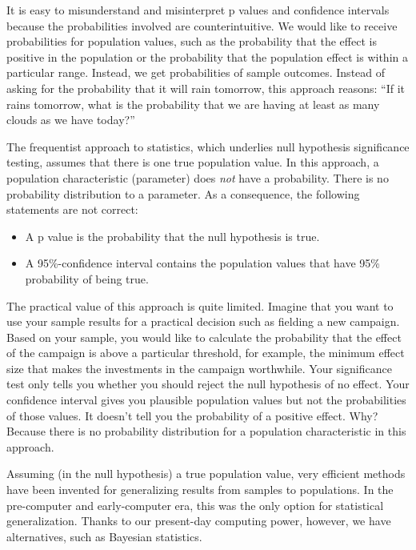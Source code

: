 \documentclass[
  english,
  doc]{apa6}
\providecommand{\tightlist}{%
  \setlength{\itemsep}{0pt}\setlength{\parskip}{0pt}}
\begin{document}
It is easy to misunderstand and misinterpret p values and confidence intervals because the probabilities involved are counterintuitive. We would like to receive probabilities for population values, such as the probability that the effect is positive in the population or the probability that the population effect is within a particular range. Instead, we get probabilities of sample outcomes. Instead of asking for the probability that it will rain tomorrow, this approach reasons: ``If it rains tomorrow, what is the probability that we are having at least as many clouds as we have today?''

The frequentist approach to statistics, which underlies null hypothesis significance testing, assumes that there is one true population value. In this approach, a population characteristic (parameter) does \emph{not} have a probability. There is no probability distribution to a parameter. As a consequence, the following statements are not correct:

\begin{itemize}
\tightlist
\item
  A p value is the probability that the null hypothesis is true.
\item
  A 95\%-confidence interval contains the population values that have 95\% probability of being true.
\end{itemize}

The practical value of this approach is quite limited. Imagine that you want to use your sample results for a practical decision such as fielding a new campaign. Based on your sample, you would like to calculate the probability that the effect of the campaign is above a particular threshold, for example, the minimum effect size that makes the investments in the campaign worthwhile. Your significance test only tells you whether you should reject the null hypothesis of no effect. Your confidence interval gives you plausible population values but not the probabilities of those values. It doesn't tell you the probability of a positive effect. Why? Because there is no probability distribution for a population characteristic in this approach.

Assuming (in the null hypothesis) a true population value, very efficient methods have been invented for generalizing results from samples to populations. In the pre-computer and early-computer era, this was the only option for statistical generalization. Thanks to our present-day computing power, however, we have alternatives, such as Bayesian statistics.
\end{document}
